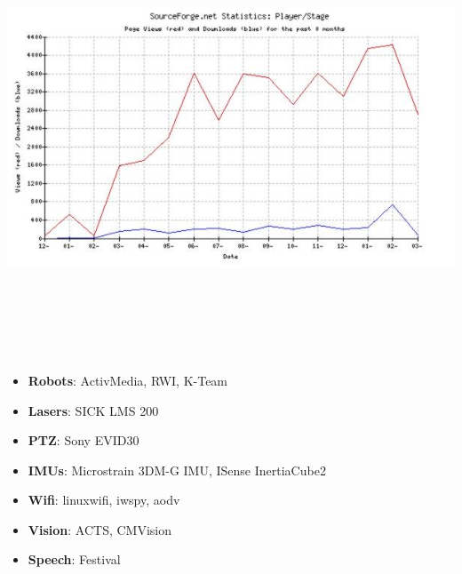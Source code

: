 \documentclass[30pt,landscape,magscalefonts]{foils}
\newcommand{\foilheadc}[1]{\foilhead{\Large \textcolor{myred}{#1}}\vspace*{-2em}}
\begin{document}
\foilheadc{Usage (cont'd)}
\begin{center}
\includegraphics[height=130mm]{stats_graph_blur.jpg}
\end{center}

\foilheadc{Supported hardware / software}
{\small
\begin{itemize}
\item {\bf Robots}: ActivMedia, RWI, K-Team
\item {\bf Lasers}: SICK LMS 200
\item {\bf PTZ}: Sony EVID30
\item {\bf IMUs}: Microstrain 3DM-G IMU, ISense InertiaCube2
\item {\bf Wifi}: linuxwifi, iwspy, aodv
\item {\bf Vision}: ACTS, CMVision
\item {\bf Speech}: Festival
\end{itemize}
}
\end{document}
